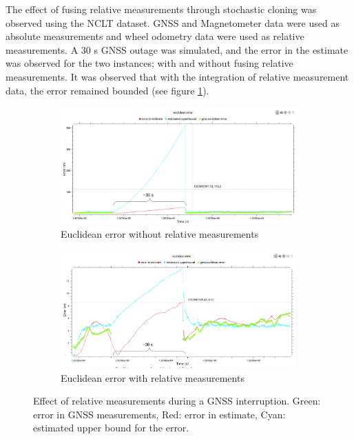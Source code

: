 The effect of fusing relative measurements through stochastic cloning was observed using the \gls{NCLT} dataset. \gls{GNSS} and Magnetometer data were used as absolute measurements and wheel odometry data were used as relative measurements. A 30 s \gls{GNSS} outage was simulated, and the error in the estimate was observed for the two instances; with and without fusing relative measurements. It was observed that with the integration of relative measurement data, the error remained bounded (see figure \ref{fig:pa:relativeMeasurements}).
\begin{figure}[h]
	\centering
    \begin{subfigure}{\textwidth}
        \includegraphics[width=\textwidth]{figs/euclidean-error-wo-rm.png}
        \caption{Euclidean error without relative measurements}
    \end{subfigure}
    \begin{subfigure}{\textwidth}
        \includegraphics[width=\textwidth]{figs/euclidean-error-with-rm.png}
        \caption{Euclidean error with relative measurements}
    \end{subfigure}
    \vspace{-0.5cm}
    \caption[Effect of relative measurements]{Effect of relative measurements during a \gls{GNSS} interruption. Green: error in \gls{GNSS} measurements, Red: error in estimate, Cyan: estimated upper bound for the error.}
    \label{fig:pa:relativeMeasurements}
    \vspace{0.5cm}
\end{figure}

